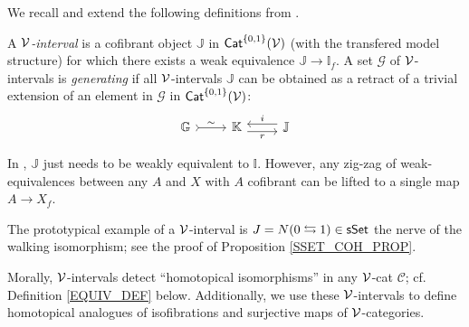 \documentclass[a4paper,10pt
,draft
]{article}%
\newcommand{\I}{\mathbb I}
\newcommand{\J}{\mathbb J}
\renewcommand{\1}{\eta}%
\begin{document}
We recall and extend the following definitions from \cite{BM13}. 

\begin{definition}
      A {\em $\mathcal V$-interval} is a cofibrant object $\J$ in $\mathsf{Cat}^{\left\{0,1\right\}}(\mathcal V)$ (with the transfered model structure)
      for which there exists a weak equivalence $\J \to \I_f$.
      A set $\mathcal{G}$ of $\mathcal V$-intervals is {\em generating} if all $\mathcal V$-intervals $\J$ can be obtained
      as a retract of a trivial extension of an element in $\mathcal{G}$ in $\mathsf{Cat}^{\left\{0,1\right\}}(\mathcal V)$:
      \begin{equation}
            \begin{tikzcd}
                  \mathbb{G} \arrow[r,rightarrowtail, "\sim"]
                  &
                  \mathbb{K} \arrow[r,yshift=-.3em, "r"']
                  &
                  \mathbb{J} \arrow[l,yshift=.3em, "i"']
            \end{tikzcd}
      \end{equation}
\end{definition}

\begin{remark}
      In \cite{BM13}, $\J$ just needs to be weakly equivalent to $\I$.
      However, any zig-zag of weak-equivalences between any $A$ and $X$ with $A$ cofibrant
      can be lifted to a single map $A \to X_f$.
\end{remark}

\begin{remark}
      The prototypical example of a $\mathcal V$-interval is $J = N(0 \leftrightarrows 1) \in \mathsf{sSet}$ the nerve of the walking isomorphism; see the proof of Proposition \ref{SSET_COH_PROP}.
\end{remark}

Morally, $\mathcal V$-intervals detect ``homotopical isomorphisms'' in any $\mathcal V$-cat $\mathcal C$; cf. Definition \ref{EQUIV_DEF} below.
Additionally, we use these $\mathcal V$-intervals to define homotopical analogues of isofibrations and surjective maps of $\mathcal V$-categories.
\end{document}
